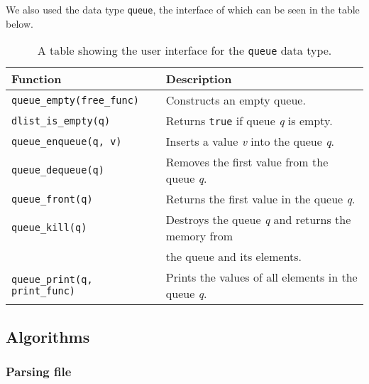 \documentclass{article}
\begin{document}
We also used the data type \texttt{queue}, the interface of which can be seen in the table below. 
\begin{table}[H]
\caption{\label{tab:queue}
A table showing the user interface for the \texttt{queue} data type.
}
\centering
\begin{tabular}{l|l}
\textbf{Function} & Description\\
\hline
\texttt{queue\_empty(free\_func)} & Constructs an empty queue. \\
\texttt{dlist\_is\_empty(q)} & Returns \texttt{true} if queue \textit{q} is empty. \\
\texttt{queue\_enqueue(q, v)} & Inserts a value \textit{v} into the queue \textit{q}.\\
\texttt{queue\_dequeue(q)} & Removes the first value from the queue \textit{q}.\\
\texttt{queue\_front(q)} & Returns the first value in the queue \textit{q}.\\
\texttt{queue\_kill(q)} & Destroys the queue \textit{q} and returns the memory from\\
&the queue and its elements.\\
\texttt{queue\_print(q, print\_func)} & Prints the values of all elements in the queue \textit{q}. \\
\end{tabular}
\end{table}


\subsection{Algorithms}
\label{sec:algorithms}
\subsubsection{Parsing file}
\end{document}
